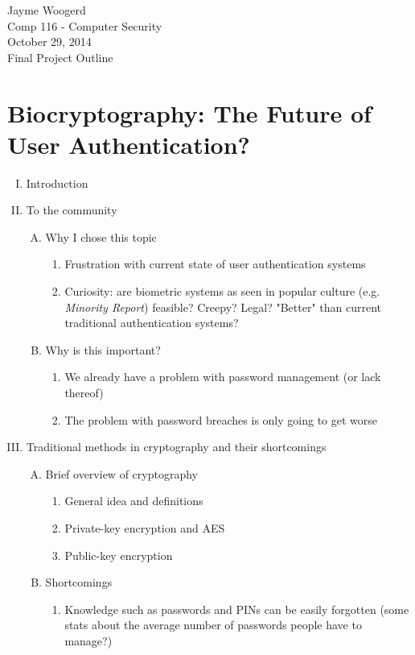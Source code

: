 \documentclass[11pt]{article}
\begin{document}
Jayme Woogerd \\
\indent Comp 116 - Computer Security \\
\indent October 29, 2014 \\
\indent Final Project Outline

\section*{Biocryptography: The Future of User Authentication?}
\begin{enumerate}[I.]
\item Introduction
\item To the community
    \begin{enumerate}[A.]
    \item Why I chose this topic
        \begin{enumerate}[1.]
        \item Frustration with current state of user authentication systems
        \item Curiosity: are biometric systems as seen in popular culture (e.g. \textit{Minority Report}) feasible? Creepy? Legal? "Better" than current traditional authentication systems?
        \end{enumerate}
    \item Why is this important?
        \begin{enumerate}[1.]
        \item We already have a problem with password management (or lack thereof)
        \item The problem with password breaches is only going to get worse
        \end{enumerate}
    \end{enumerate}
\item Traditional methods in cryptography and their shortcomings
    \begin{enumerate}[A.]
    \item Brief overview of cryptography
        \begin{enumerate}[1.]
        \item General idea and definitions
        \item Private-key encryption and AES
        \item Public-key encryption
        \end{enumerate}
    \item Shortcomings
        \begin{enumerate}[1.]
        \item Knowledge such as passwords and PINs can be easily forgotten (some stats about the average number of passwords people have to manage?)

\end{enumerate}
\end{enumerate}
\end{enumerate}
\end{document}
